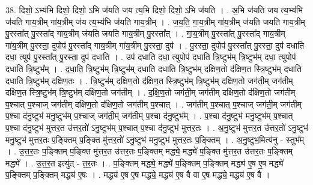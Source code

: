 \documentclass[17pt]{extarticle}
\begin{document}
38. दिशो॒ ऽभ्य॑भि दिशो॒ दिशो॒ ऽभि ज॑यति जय त्य॒भि दिशो॒ दिशो॒ ऽभि ज॑यति । . अ॒भि ज॑यति जय त्य॒भ्य॑भि ज॑यति गाय॒त्रीम् गा॑य॒त्रीम् ज॑य त्य॒भ्य॑भि ज॑यति गाय॒त्रीम् । . ज॒य॒ति॒ गा॒य॒त्रीम् गा॑य॒त्रीम् ज॑यति जयति गाय॒त्रीम् पु॒रस्ता᳚त् पु॒रस्ता᳚द् गाय॒त्रीम् ज॑यति जयति गाय॒त्रीम् पु॒रस्ता᳚त् । . गा॒य॒त्रीम् पु॒रस्ता᳚त् पु॒रस्ता᳚द् गाय॒त्रीम् गा॑य॒त्रीम् पु॒रस्ता॒ दुपोप॑ पु॒रस्ता᳚द् गाय॒त्रीम् गा॑य॒त्रीम् पु॒रस्ता॒ दुप॑ । . पु॒रस्ता॒ दुपोप॑ पु॒रस्ता᳚त् पु॒रस्ता॒ दुप॑ दधाति दधा॒ त्युप॑ पु॒रस्ता᳚त् पु॒रस्ता॒ दुप॑ दधाति । . उप॑ दधाति दधा॒ त्युपोप॑ दधाति त्रि॒ष्टुभ॑म् त्रि॒ष्टुभ॑म् दधा॒ त्युपोप॑ दधाति त्रि॒ष्टुभ᳚म् । . द॒धा॒ति॒ त्रि॒ष्टुभ॑म् त्रि॒ष्टुभ॑म् दधाति दधाति त्रि॒ष्टुभ॑म् दक्षिण॒तो द॑क्षिण॒त स्त्रि॒ष्टुभ॑म् दधाति दधाति त्रि॒ष्टुभ॑म् दक्षिण॒तः । . त्रि॒ष्टुभ॑म् दक्षिण॒तो द॑क्षिण॒त स्त्रि॒ष्टुभ॑म् त्रि॒ष्टुभ॑म् दक्षिण॒तो जग॑ती॒म् जग॑तीम् दक्षिण॒त स्त्रि॒ष्टुभ॑म् त्रि॒ष्टुभ॑म् दक्षिण॒तो जग॑तीम् । . द॒क्षि॒ण॒तो जग॑ती॒म् जग॑तीम् दक्षिण॒तो द॑क्षिण॒तो जग॑तीम् प॒श्चात् प॒श्चाज् जग॑तीम् दक्षिण॒तो द॑क्षिण॒तो जग॑तीम् प॒श्चात् । . जग॑तीम् प॒श्चात् प॒श्चाज् जग॑ती॒म् जग॑तीम् प॒श्चा द॑नु॒ष्टुभ॑ मनु॒ष्टुभ॑म् प॒श्चाज् जग॑ती॒म् जग॑तीम् प॒श्चा द॑नु॒ष्टुभ᳚म् । . प॒श्चा द॑नु॒ष्टुभ॑ मनु॒ष्टुभ॑म् प॒श्चात् प॒श्चा द॑नु॒ष्टुभ॑ मुत्तर॒त उ॑त्तर॒तो॑ ऽनु॒ष्टुभ॑म् प॒श्चात् प॒श्चा द॑नु॒ष्टुभ॑ मुत्तर॒तः । . अ॒नु॒ष्टुभ॑ मुत्तर॒त उ॑त्तर॒तो॑ ऽनु॒ष्टुभ॑ मनु॒ष्टुभ॑ मुत्तर॒तः प॒ङ्क्तिम् प॒ङ्क्ति मु॑त्तर॒तो॑ ऽनु॒ष्टुभ॑ मनु॒ष्टुभ॑ मुत्तर॒तः प॒ङ्क्तिम् । . अ॒नु॒ष्टुभ॒मित्य॑नु - स्तुभ᳚म् । . उ॒त्त॒र॒तः प॒ङ्क्तिम् प॒ङ्क्ति मु॑त्तर॒त उ॑त्तर॒तः प॒ङ्क्तिम् मद्ध्ये॒ मद्ध्ये॑ प॒ङ्क्ति मु॑त्तर॒त उ॑त्तर॒तः प॒ङ्क्तिम् मद्ध्ये᳚ । . उ॒त्त॒र॒त इत्यु॑त् - त॒र॒तः । . प॒ङ्क्तिम् मद्ध्ये॒ मद्ध्ये॑ प॒ङ्क्तिम् प॒ङ्क्तिम् मद्ध्य॑ ए॒ष ए॒ष मद्ध्ये॑ प॒ङ्क्तिम् प॒ङ्क्तिम् मद्ध्य॑ ए॒षः । . मद्ध्य॑ ए॒ष ए॒ष मद्ध्ये॒ मद्ध्य॑ ए॒ष वै वा ए॒ष मद्ध्ये॒ मद्ध्य॑ ए॒ष वै । \newline
\end{document}
